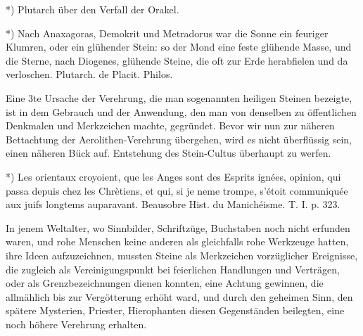 \documentclass[a4paper, 11pt, oneside, polutonikogreek, german]{article}
\begin{document}
*) Plutarch über den Verfall der Orakel.

*) Nach Anaxagoras, Demokrit und Metradorus war die Sonne ein feuriger Klumren, oder ein glühender Stein: so der Mond eine feste glühende Masse, und die Sterne, nach Diogenes, glühende Steine, die oft zur Erde herabfielen und da verloschen. Plutarch. de Placit. Philos.

Eine 3te Ursache der Verehrung, die man sogenannten heiligen Steinen bezeigte, ist in dem Gebrauch und der Anwendung, den man von denselben zu öffentlichen Denkmalen und Merkzeichen machte, gegründet. Bevor wir nun zur näheren Bettachtung der Aerolithen-Verehrung übergehen, wird es nicht überflüssig sein, einen näheren Bück auf. Entstehung des Stein-Cultus überhaupt zu werfen.

*) Les orientaux croyoient, que les Anges sont des Esprits ignées, opinion, qui passa depuis chez les Chrètiens, et qui, si je neme trompe, s'étoit communiquée aux juifs longtems auparavant. Beausobre Hist. du Manichéisme. T. I. p. 323.

In jenem Weltalter, wo Sinnbilder, Schriftzüge, Buchstaben noch nicht erfunden waren, und rohe Menschen keine anderen als gleichfalls rohe Werkzeuge hatten, ihre Ideen aufzuzeichnen, mussten Steine als Merkzeichen vorzüglicher Ereignisse, die zugleich als Vereinigungspunkt bei feierlichen Handlungen und Verträgen, oder als Grenzbezeichnungen dienen konnten, eine Achtung gewinnen, die allmählich bis zur Vergötterung erhöht ward, und durch den geheimen Sinn, den spätere Mysterien, Priester, Hierophanten diesen Gegenständen beilegten, eine noch höhere Verehrung erhalten.
\end{document}
